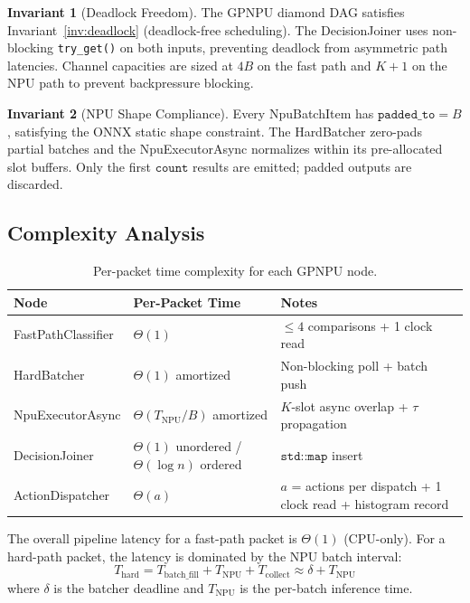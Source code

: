 \documentclass[11pt,a4paper,twoside]{article}
\theoremstyle{definition}
\newtheorem{invariant}{Invariant}[section]
\theoremstyle{remark}
\begin{document}
\begin{invariant}[Deadlock Freedom]
The GPNPU diamond DAG satisfies Invariant~\ref{inv:deadlock} (deadlock-free scheduling). The DecisionJoiner uses non-blocking \texttt{try\_get()} on both inputs, preventing deadlock from asymmetric path latencies. Channel capacities are sized at $4B$ on the fast path and $K+1$ on the NPU path to prevent backpressure blocking.
\end{invariant}

\begin{invariant}[NPU Shape Compliance]
Every NpuBatchItem has $\texttt{padded\_to} = B$, satisfying the ONNX static shape constraint. The HardBatcher zero-pads partial batches and the NpuExecutorAsync normalizes within its pre-allocated slot buffers. Only the first $\texttt{count}$ results are emitted; padded outputs are discarded.
\end{invariant}

\subsection{Complexity Analysis}

\begin{table}[H]
\centering
\small
\begin{tabular}{lll}
\toprule
\textbf{Node} & \textbf{Per-Packet Time} & \textbf{Notes} \\
\midrule
FastPathClassifier & $\Theta(1)$ & $\leq 4$ comparisons + 1 clock read \\
HardBatcher        & $\Theta(1)$ amortized & Non-blocking poll + batch push \\
NpuExecutorAsync   & $\Theta(T_{\text{NPU}} / B)$ amortized & $K$-slot async overlap + $\tau$ propagation \\
DecisionJoiner     & $\Theta(1)$ unordered / $\Theta(\log n)$ ordered & $\texttt{std::map}$ insert \\
ActionDispatcher   & $\Theta(a)$ & $a$ = actions per dispatch + 1 clock read + histogram record \\
\bottomrule
\end{tabular}
\caption{Per-packet time complexity for each GPNPU node.}
\label{tab:gpnpu-complexity}
\end{table}

The overall pipeline latency for a fast-path packet is $\Theta(1)$ (CPU-only). For a hard-path packet, the latency is dominated by the NPU batch interval:
\begin{equation}
T_{\text{hard}} = T_{\text{batch\_fill}} + T_{\text{NPU}} + T_{\text{collect}} \approx \delta + T_{\text{NPU}}
\end{equation}
where $\delta$ is the batcher deadline and $T_{\text{NPU}}$ is the per-batch inference time.
\end{document}
